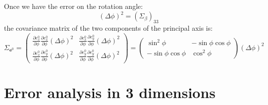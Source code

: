 \documentclass[a4paper,11pt]{article}
\newcommand{\pder}[2]{\frac{\partial#1}{\partial#2}}
\begin{document}
Once we have the error on the rotation angle:
\begin{equation}
  (\Delta\phi)^2 = (\Sigma_\beta)_{33}
\end{equation}
the covariance matrix of the two components of the principal axis is:
\begin{equation}
  \Sigma_{\mathbf{e}^0} =
  \begin{pmatrix}
    \pder{e^0_x}{\phi}\pder{e^0_x}{\phi}(\Delta\phi)^2 &
    \pder{e^0_x}{\phi}\pder{e^0_y}{\phi}(\Delta\phi)^2\\
    \pder{e^0_x}{\phi}\pder{e^0_y}{\phi}(\Delta\phi)^2 &
    \pder{e^0_y}{\phi}\pder{e^0_y}{\phi}(\Delta\phi)^2
  \end{pmatrix} =
  \begin{pmatrix}
    \sin^2\phi & -\sin\phi\cos\phi\\
    -\sin\phi\cos\phi & \cos^2\phi
  \end{pmatrix}(\Delta\phi)^2
\end{equation}


\section{Error analysis in 3 dimensions}
\end{document}
